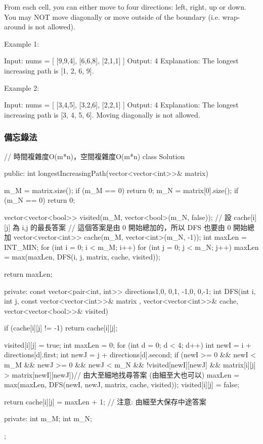 From each cell, you can either move to four directions: left, right, up or down. You may NOT move diagonally or move outside of the boundary (i.e. wrap-around is not allowed).

Example 1:
\begin{Code}
Input: nums =
[
  [9,9,4],
  [6,6,8],
  [2,1,1]
]
Output: 4
Explanation: The longest increasing path is [1, 2, 6, 9].
\end{Code}

Example 2:
\begin{Code}
Input: nums =
[
  [3,4,5],
  [3,2,6],
  [2,2,1]
]
Output: 4
Explanation: The longest increasing path is [3, 4, 5, 6]. Moving diagonally is not allowed.
\end{Code}


\subsubsection{備忘錄法}
\begin{Code}
// 時間複雜度O(m*n)，空間複雜度O(m*n)
class Solution {
public:
    int longestIncreasingPath(vector<vector<int>>& matrix) {
        m_M = matrix.size();
        if (m_M == 0) return 0;
        m_N = matrix[0].size();
        if (m_N == 0) return 0;

        vector<vector<bool>> visited(m_M, vector<bool>(m_N, false));
        // 設 cache[i][j] 為 i,j 的最長答案
        // 這個答案是由 0 開始總加的，所以 DFS 也要由 0 開始總加
        vector<vector<int>> cache(m_M, vector<int>(m_N, -1));
        int maxLen = INT_MIN;
        for (int i = 0; i < m_M; i++)
        {
            for (int j = 0; j < m_N; j++)
            {
                maxLen = max(maxLen, DFS(i, j, matrix, cache, visited));
            }
        }


        return maxLen;
    }
private:
    const vector<pair<int, int>> directions{{1,0}, {0,1}, {-1,0}, {0,-1}};
    int DFS(int i, int j, const vector<vector<int>>& matrix
            , vector<vector<int>>& cache, vector<vector<bool>>& visited)
    {
        if (cache[i][j] != -1) return cache[i][j];

        visited[i][j] = true;
        int maxLen = 0;
        for (int d = 0; d < 4; d++)
        {
            int newI = i + directions[d].first;
            int newJ = j + directions[d].second;
            if (newI >= 0 && newI < m_M && newJ >= 0 && newJ < m_N
                && !visited[newI][newJ]
                && matrix[i][j] > matrix[newI][newJ])// 由大至細地找尋答案 (由細至大也可以)
                maxLen = max(maxLen, DFS(newI, newJ, matrix, cache, visited));
        }
        visited[i][j] = false;

        return cache[i][j] = maxLen + 1; // 注意: 由細至大保存中途答案
    }
private:
    int m_M;
    int m_N;
};
\end{Code}

